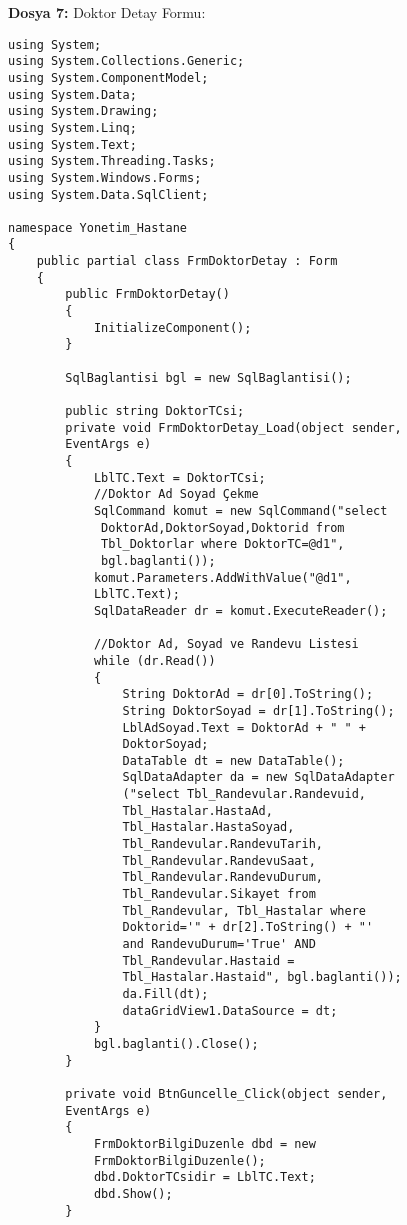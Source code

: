 \textbf{Dosya 7:} Doktor Detay Formu:

\begin{lstlisting}
using System;
using System.Collections.Generic;
using System.ComponentModel;
using System.Data;
using System.Drawing;
using System.Linq;
using System.Text;
using System.Threading.Tasks;
using System.Windows.Forms;
using System.Data.SqlClient;

namespace Yonetim_Hastane
{
    public partial class FrmDoktorDetay : Form
    {
        public FrmDoktorDetay()
        {
            InitializeComponent();
        }

        SqlBaglantisi bgl = new SqlBaglantisi();

        public string DoktorTCsi;
        private void FrmDoktorDetay_Load(object sender, 
        EventArgs e)
        {
            LblTC.Text = DoktorTCsi;
            //Doktor Ad Soyad Çekme
            SqlCommand komut = new SqlCommand("select
             DoktorAd,DoktorSoyad,Doktorid from 
             Tbl_Doktorlar where DoktorTC=@d1", 
             bgl.baglanti());
            komut.Parameters.AddWithValue("@d1", 
            LblTC.Text);
            SqlDataReader dr = komut.ExecuteReader();

            //Doktor Ad, Soyad ve Randevu Listesi
            while (dr.Read())
            {
                String DoktorAd = dr[0].ToString();
                String DoktorSoyad = dr[1].ToString();
                LblAdSoyad.Text = DoktorAd + " " + 
                DoktorSoyad;
                DataTable dt = new DataTable();
                SqlDataAdapter da = new SqlDataAdapter
                ("select Tbl_Randevular.Randevuid, 
                Tbl_Hastalar.HastaAd, 
                Tbl_Hastalar.HastaSoyad, 
                Tbl_Randevular.RandevuTarih, 
                Tbl_Randevular.RandevuSaat, 
                Tbl_Randevular.RandevuDurum, 
                Tbl_Randevular.Sikayet from 
                Tbl_Randevular, Tbl_Hastalar where 
                Doktorid='" + dr[2].ToString() + "' 
                and RandevuDurum='True' AND 
                Tbl_Randevular.Hastaid = 
                Tbl_Hastalar.Hastaid", bgl.baglanti());
                da.Fill(dt);
                dataGridView1.DataSource = dt;
            }
            bgl.baglanti().Close();
        }

        private void BtnGuncelle_Click(object sender, 
        EventArgs e)
        {
            FrmDoktorBilgiDuzenle dbd = new 
            FrmDoktorBilgiDuzenle();
            dbd.DoktorTCsidir = LblTC.Text;
            dbd.Show();
        }


\end{lstlisting}
